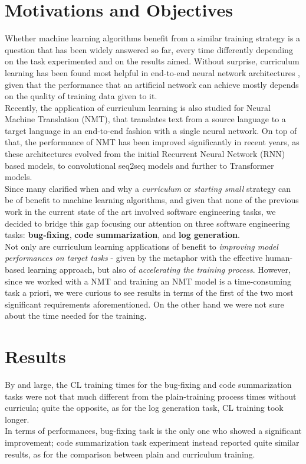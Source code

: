\section{Motivations and Objectives}
\label{chapter:MAO}
Whether machine learning algorithms benefit from a similar training strategy is a question that has been widely answered so far, 
every time differently depending on the task experimented and on the results aimed. Without surprise, curriculum learning 
has been found most helpful in end-to-end neural network architectures \cite{bengio2009curriculum},
given that the performance that an artificial network can achieve mostly depends on the quality of training data given to it.\\
Recently, the application of curriculum learning is also studied for Neural Machine Translation (NMT), that translates text from a source
language to a target language in an end-to-end fashion with a single neural network. On top of that, the performance of 
NMT has been improved significantly in recent years, as these architectures evolved from the initial Recurrent Neural Network (RNN) based models, to convolutional
seq2seq models and further to Transformer models. \\

Since many clarified when and why a \textit{curriculum} or \textit{starting small} strategy can be of benefit
to machine learning algorithms, and given that none of the previous work in the current state of the art 
involved software engineering tasks, we decided to bridge this gap focusing our attention on three software engineering tasks: \textbf{bug-fixing}, 
\textbf{code summarization}, and \textbf{log generation}.\\

Not only are curriculum learning applications of benefit to \textit{improving model performances
on target tasks} - given by the metaphor with 
the effective human-based learning approach, but also of \textit{accelerating the training process}.
However, since we worked with a NMT and training an NMT model is a time-consuming task a priori, 
we were curious to see results in terms of the first of the two most significant requirements 
aforementioned. On the other hand we were not sure about the time needed for the training.


\section{Results}
By and large, the CL training times for the bug-fixing 
and code summarization tasks were not that much different from
the plain-training process times without curricula; quite the opposite, as for the log generation task, CL training took longer.\\
In terms of performances, bug-fixing task is the only one who showed a significant improvement; code summarization task experiment
instead reported quite similar results, as for the comparison between plain and curriculum training.

